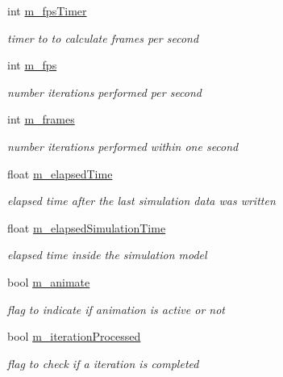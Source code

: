\begin{DoxyCompactItemize}
int \hyperlink{class_g_l_window_a4f6b732547e0cfd593c1933d5e497ee6}{m\_\-fpsTimer}
\begin{DoxyCompactList}\small\item\em timer to to calculate frames per second \item\end{DoxyCompactList}\item 
int \hyperlink{class_g_l_window_a83e019efd2becc005d6bf4493fc3adb2}{m\_\-fps}
\begin{DoxyCompactList}\small\item\em number iterations performed per second \item\end{DoxyCompactList}\item 
int \hyperlink{class_g_l_window_a86818489d82e1e6a19d35ded614af48c}{m\_\-frames}
\begin{DoxyCompactList}\small\item\em number iterations performed within one second \item\end{DoxyCompactList}\item 
float \hyperlink{class_g_l_window_aa3dfb7b4e6a13e25ebc5c9db22216b2c}{m\_\-elapsedTime}
\begin{DoxyCompactList}\small\item\em elapsed time after the last simulation data was written \item\end{DoxyCompactList}\item 
float \hyperlink{class_g_l_window_a808ad95aba9f47b8eca08eeb98ca61f2}{m\_\-elapsedSimulationTime}
\begin{DoxyCompactList}\small\item\em elapsed time inside the simulation model \item\end{DoxyCompactList}\item 
bool \hyperlink{class_g_l_window_a1d74b588450b6719a4b1446ad47927dc}{m\_\-animate}
\begin{DoxyCompactList}\small\item\em flag to indicate if animation is active or not \item\end{DoxyCompactList}\item 
bool \hyperlink{class_g_l_window_a79f6f10959fa411711c21f937ff96a72}{m\_\-iterationProcessed}
\begin{DoxyCompactList}\small\item\em flag to check if a iteration is completed \item\end{DoxyCompactList}\item 

\end{DoxyCompactItemize}
